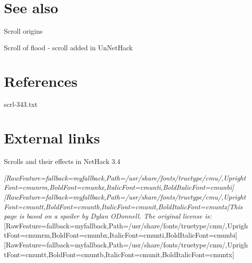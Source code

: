\section{See also}
\label{18}

\begin{myitemize}\item{}Scroll origins\footnotemark[110]
\item{}Scroll of flood\footnotemark[111] -{} scroll added in UnNetHack\footnotemark[112]
\end{myitemize}

\section{References}
\label{19}

\begin{myitemize}\item{}scrl-{}343.txt\footnotemark[113]
\end{myitemize}

\section{External links}
\label{20}

\begin{myitemize}\item{}Scrolls and their effects in NetHack 3.4\footnotemark[114]
\end{myitemize}


{\itshape \allowbreak{}\setmainfont{cmunti.ttf}[RawFeature={fallback=myfallback},Path=/usr/share/fonts/truetype/cmu/,UprightFont=cmunrm,BoldFont=cmunbx,ItalicFont=cmunti,BoldItalicFont=cmunbi]\setmonofont{cmunti.ttf}[RawFeature={fallback=myfallback},Path=/usr/share/fonts/truetype/cmu/,UprightFont=cmuntt,BoldFont=cmuntb,ItalicFont=cmunit,BoldItalicFont=cmuntx]\itshape This page is based on a spoiler by Dylan O\textquotesingle{}Donnell\footnotemark[115]. The original license is:}\allowbreak{}\setmainfont{cmunrm.ttf}[RawFeature={fallback=myfallback},Path=/usr/share/fonts/truetype/cmu/,UprightFont=cmunrm,BoldFont=cmunbx,ItalicFont=cmunti,BoldItalicFont=cmunbi]\setmonofont{cmunrm.ttf}[RawFeature={fallback=myfallback},Path=/usr/share/fonts/truetype/cmu/,UprightFont=cmuntt,BoldFont=cmuntb,ItalicFont=cmunit,BoldItalicFont=cmuntx]
